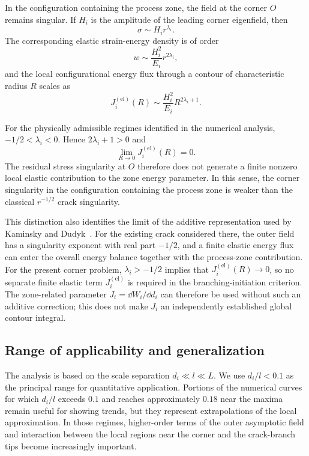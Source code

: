 In the configuration containing the process zone, the field at the corner
$O$ remains singular. If $H_i$ is the amplitude of the leading corner
eigenfield, then
\begin{equation*}
  \sigma\sim H_i r^{\lambda_i}.
\end{equation*}
The corresponding elastic strain-energy density is of order
\begin{equation*}
  w\sim\frac{H_i^2}{E_i}r^{2\lambda_i},
\end{equation*}
and the local configurational energy flux through a contour of
characteristic radius $R$ scales as
\begin{equation}
\label{eq:local-elastic-flux-scaling}
  J_i^{(\mathrm{el})}(R)
  \sim\frac{H_i^2}{E_i}R^{2\lambda_i+1}.
\end{equation}

For the physically admissible regimes identified in the numerical
analysis, $-1/2<\lambda_i<0$. Hence $2\lambda_i+1>0$ and
\begin{equation*}
  \lim_{R\to0}J_i^{(\mathrm{el})}(R)=0.
\end{equation*}
The residual stress singularity at $O$ therefore does not generate a
finite nonzero local elastic contribution to the zone energy parameter.
In this sense, the corner singularity in the configuration containing the
process zone is weaker than the classical $r^{-1/2}$ crack singularity.

This distinction also identifies the limit of the additive representation
used by Kaminsky and Dudyk~\cite{KaminskyDudyk2026Criteria}. For the
existing crack considered there, the outer field has a singularity exponent
with real part $-1/2$, and a finite elastic energy flux can enter the overall energy
balance together with the process-zone contribution. For the present
corner problem, $\lambda_i>-1/2$ implies that
$J_i^{(\mathrm{el})}(R)\to0$, so no separate finite elastic term
$J_i^{(\mathrm{el})}$ is required in the branching-initiation criterion. The zone-related parameter
$J_i=\dd W_i/\dd d_i$ can therefore be used without such an additive
correction; this does not make $J_i$ an independently established global
contour integral.

\subsection{Range of applicability and generalization}
\label{subsec:discussion-scope}

The analysis is based on the scale separation $d_i\ll l\ll L$. We use
$d_i/l<0.1$ as the principal range for quantitative application. Portions
of the numerical curves for which $d_i/l$ exceeds $0.1$ and reaches
approximately $0.18$ near the maxima remain useful for showing trends, but
they represent extrapolations of the local approximation. In those
regimes, higher-order terms of the outer asymptotic field and interaction
between the local regions near the corner and the crack-branch tips become
increasingly important.

